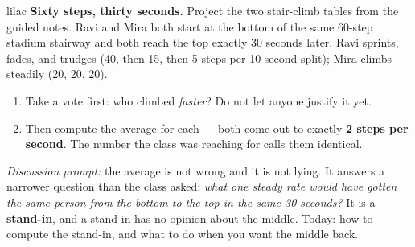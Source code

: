 \documentclass[10pt]{article}
\begin{document}
\begin{skillbox}[Hook]{lilac}
    \textbf{Sixty steps, thirty seconds.} Project the two stair-climb tables
    from the guided notes. Ravi and Mira both start at the bottom of the same
    60-step stadium stairway and both reach the top exactly 30 seconds later.
    Ravi sprints, fades, and trudges (40, then 15, then 5 steps per 10-second
    split); Mira climbs steadily (20, 20, 20).
    \begin{enumerate}[itemsep=2pt]
        \item Take a vote first: who climbed \textit{faster}? Do not let anyone
              justify it yet.
        \item Then compute the average for each --- both come out to exactly
              \textbf{2 steps per second}. The number the class was reaching
              for calls them identical.
    \end{enumerate}
    \textit{Discussion prompt:} the average is not wrong and it is not lying.
    It answers a narrower question than the class asked: \textit{what one
    steady rate would have gotten the same person from the bottom to the top
    in the same 30 seconds?} It is a \textbf{stand-in}, and a stand-in has no
    opinion about the middle. Today: how to compute the stand-in, and what to
    do when you want the middle back.
\end{skillbox}
\end{document}
